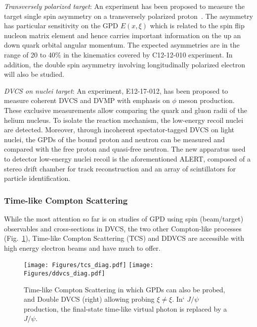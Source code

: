 {\it Transversely polarized target}: 
An experiment has been proposed to measure the
target single spin asymmetry on a transversely polarized
proton~\cite{C12-12-010}. The asymmetry has
particular sensitivity on the
GPD $E(x,\xi)$ which is related to the spin flip
nucleon matrix element and hence carries important information on the up an down quark orbital angular momentum. The expected asymmetries are in the range of 20 to 40\% in the kinematics covered by C12-12-010 experiment. In addition, the double spin 
asymmetry involving longitudinally polarized electron will also be studied. 

{\it DVCS on nuclei target}: An experiment, E12-17-012\cite{E12-17-012}, has been proposed to measure coherent DVCS and DVMP with emphasis  on $\phi$ meson production. These exclusive measurements 
allow comparing the quark and gluon radii of the helium nucleus. To isolate the reaction mechanism, the low-energy
recoil nuclei are detected. Moreover, through incoherent spectator-tagged DVCS on light nuclei, the GPDs of the bound proton and neutron can be measured and compared
with the free proton and quasi-free neutron. The new apparatus used to detector low-energy nuclei recoil 
is the aforementioned ALERT, composed of a stereo drift chamber for track reconstruction and an array of scintillators for particle identification. 

\subsubsection*{Time-like Compton Scattering}


While the most attention so far is on studies of GPD using spin (beam/target) observables and cross-sections in DVCS, the two other Compton-like processes (Fig.~\ref{fig:tcsddvcs}), Time-like Compton Scattering (TCS) and DDVCS are accessible with high energy electron beams and have much to offer. 

\begin{figure}
\begin{center}
\texttt{[image: Figures/tcs\_diag.pdf]}
\texttt{[image: Figures/ddvcs\_diag.pdf]}
\caption{Time-like Compton Scattering in which GPDs can also be probed, and Double DVCS (right) allowing probing $\xi\ne\xi$. In` $J/\psi$ production, the final-state time-like virtual photon is replaced by a $J/\psi$.
}
\label{fig:tcsddvcs} 
\end{center}
\end{figure}

